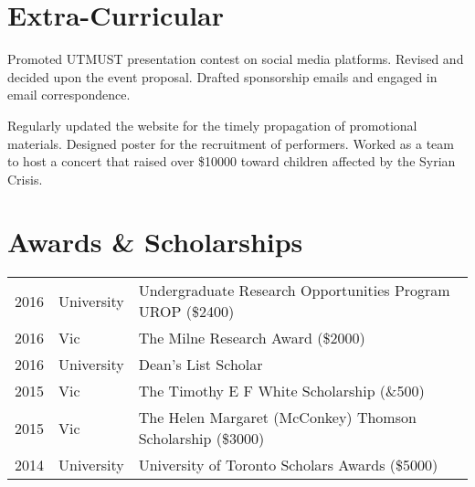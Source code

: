 \documentclass[]{deedy-resume-openfont}
\begin{document}
\begin{minipage}[t]{0.66\textwidth}
\section{Extra-Curricular}

Promoted UTMUST presentation contest on social media platforms. Revised and decided upon the event proposal. Drafted sponsorship emails and engaged in email correspondence.
\sectionsep


Regularly updated the website for the timely propagation of promotional materials. Designed poster for the recruitment of performers. Worked as a team to host a concert that raised over \$10000 toward children affected by the Syrian Crisis.
\sectionsep



\section{Awards \& Scholarships}
\begin{tabular}{rll}
2016	     & University  & Undergraduate Research Opportunities Program UROP (\$2400) \\
2016	     & Vic  	   & The Milne Research Award (\$2000) \\
2016    	 & University  & Dean’s List Scholar \\
2015 		 & Vic 		   & The Timothy E F White Scholarship (\&500) \\
2015	     & Vic         & The Helen Margaret (McConkey) Thomson Scholarship (\$3000) \\
2014 		 & University  & University of Toronto Scholars Awards (\$5000) \\
\end{tabular}
\sectionsep




\end{minipage}
\end{document}
